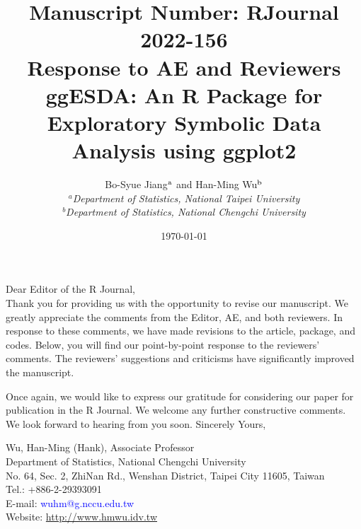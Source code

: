 \documentclass[11pt]{article}
\begin{document}
\title{{\small Manuscript Number: RJournal 2022-156} \\
	{\bf Response to AE and Reviewers} \\
ggESDA: An R Package for Exploratory Symbolic Data Analysis using ggplot2}

\author{Bo-Syue Jiang$^{\rm a}$ and Han-Ming Wu$^{\rm b}$
\vspace{6pt}\\
$^{a}${\em{Department of Statistics, National Taipei University}}\\
$^{b}${\em{Department of Statistics, National Chengchi University}}}

\date{\today}
\maketitle


Dear Editor of the R Journal,\\

Thank you for providing us with the opportunity to revise our manuscript. We greatly appreciate the comments from the Editor, AE, and both reviewers. In response to these comments, we have made revisions to the article, package, and codes. Below, you will find our point-by-point response to the reviewers' comments. The reviewers' suggestions and criticisms have significantly improved the manuscript.

Once again, we would like to express our gratitude for considering our paper for publication in the R Journal. We welcome any further constructive comments. We look forward to hearing from you soon.
\vspace{0.5cm}
\noindent Sincerely Yours, 

\noindent Wu, Han-Ming (Hank), Associate Professor \\
Department of Statistics, National Chengchi University\\
No. 64, Sec. 2, ZhiNan Rd., Wenshan District,
Taipei City 11605, Taiwan \\
Tel.: +886-2-29393091\\
E-mail: \textcolor{blue}{wuhm@g.nccu.edu.tw}\\
Website: \textcolor{blue}{\url{http://www.hmwu.idv.tw}}


\clearpage{} 
\end{document}
